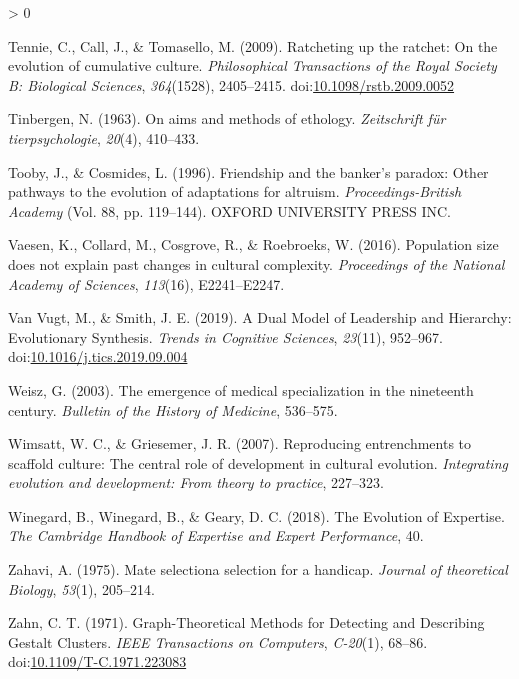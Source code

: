 \documentclass[
  11pt,
]{article}
\newlength{\cslhangindent}
\newenvironment{CSLReferences}[2] %
 {%
  \setlength{\parindent}{0pt}
  \ifodd #1 \everypar{\setlength{\hangindent}{\cslhangindent}}\ignorespaces\fi
  \ifnum #2 > 0
  \setlength{\parskip}{#2\baselineskip}
  \fi
 }%
 {}
\begin{document}
\begin{CSLReferences}{1}{0}
\leavevmode\hypertarget{ref-tennieRatchetingRatchetEvolution2009}{}%
Tennie, C., Call, J., \& Tomasello, M. (2009). Ratcheting up the ratchet: On the evolution of cumulative culture. \emph{Philosophical Transactions of the Royal Society B: Biological Sciences}, \emph{364}(1528), 2405--2415. doi:\href{https://doi.org/10.1098/rstb.2009.0052}{10.1098/rstb.2009.0052}

\leavevmode\hypertarget{ref-tinbergenAimsMethodsEthology1963}{}%
Tinbergen, N. (1963). On aims and methods of ethology. \emph{Zeitschrift für tierpsychologie}, \emph{20}(4), 410--433.

\leavevmode\hypertarget{ref-toobyFriendshipBankerParadox1996}{}%
Tooby, J., \& Cosmides, L. (1996). Friendship and the banker's paradox: {Other} pathways to the evolution of adaptations for altruism. \emph{Proceedings-{British Academy}} (Vol. 88, pp. 119--144). {OXFORD UNIVERSITY PRESS INC.}

\leavevmode\hypertarget{ref-vaesen2016population}{}%
Vaesen, K., Collard, M., Cosgrove, R., \& Roebroeks, W. (2016). Population size does not explain past changes in cultural complexity. \emph{Proceedings of the National Academy of Sciences}, \emph{113}(16), E2241--E2247.

\leavevmode\hypertarget{ref-vanvugtDualModelLeadership2019}{}%
Van Vugt, M., \& Smith, J. E. (2019). A {Dual Model} of {Leadership} and {Hierarchy}: {Evolutionary Synthesis}. \emph{Trends in Cognitive Sciences}, \emph{23}(11), 952--967. doi:\href{https://doi.org/10.1016/j.tics.2019.09.004}{10.1016/j.tics.2019.09.004}

\leavevmode\hypertarget{ref-weisz2003emergence}{}%
Weisz, G. (2003). The emergence of medical specialization in the nineteenth century. \emph{Bulletin of the History of Medicine}, 536--575.

\leavevmode\hypertarget{ref-wimsattReproducingEntrenchmentsScaffold2007}{}%
Wimsatt, W. C., \& Griesemer, J. R. (2007). Reproducing entrenchments to scaffold culture: {The} central role of development in cultural evolution. \emph{Integrating evolution and development: From theory to practice}, 227--323.

\leavevmode\hypertarget{ref-winegardEvolutionExpertise2018}{}%
Winegard, B., Winegard, B., \& Geary, D. C. (2018). The {Evolution} of {Expertise}. \emph{The Cambridge Handbook of Expertise and Expert Performance}, 40.

\leavevmode\hypertarget{ref-zahaviMateSelectionSelection1975}{}%
Zahavi, A. (1975). Mate selection{}a selection for a handicap. \emph{Journal of theoretical Biology}, \emph{53}(1), 205--214.

\leavevmode\hypertarget{ref-zahnGraphTheoreticalMethodsDetecting1971}{}%
Zahn, C. T. (1971). Graph-{Theoretical Methods} for {Detecting} and {Describing Gestalt Clusters}. \emph{IEEE Transactions on Computers}, \emph{C-20}(1), 68--86. doi:\href{https://doi.org/10.1109/T-C.1971.223083}{10.1109/T-C.1971.223083}

\end{CSLReferences}
\end{document}

